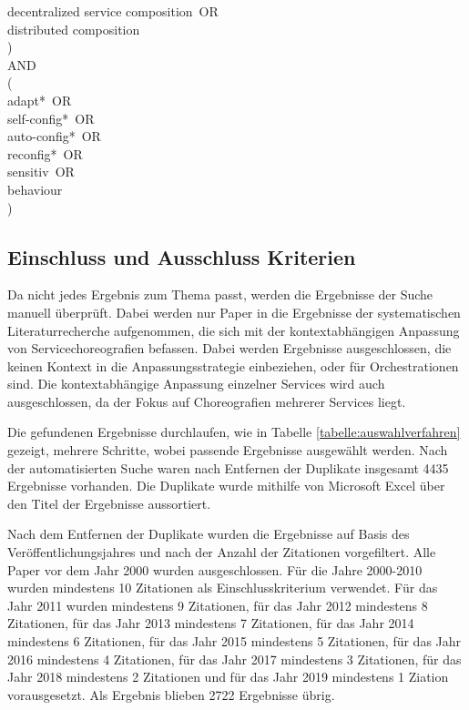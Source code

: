 \documentclass[conference,compsoc,ngerman]{IEEEtran}
\begin{document}
\glqq decentralized service composition\grqq~OR\\
\glqq distributed composition\grqq\\
) \\
AND\\
(\\
\glqq adapt*\grqq~OR\\
\glqq self-config*\grqq~OR\\
\glqq auto-config*\grqq~OR\\
\glqq reconfig*\grqq~OR\\
\glqq sensitiv\grqq~OR\\
\glqq behaviour\grqq\\
)\\

\subsection{Einschluss und Ausschluss Kriterien}
Da nicht jedes Ergebnis zum Thema passt, werden die Ergebnisse der Suche manuell überprüft. Dabei werden nur Paper in die Ergebnisse der systematischen Literaturrecherche aufgenommen, die sich mit der kontextabhängigen Anpassung von Servicechoreografien befassen. Dabei werden Ergebnisse ausgeschlossen, die keinen Kontext in die Anpassungsstrategie einbeziehen, oder für Orchestrationen sind. Die kontextabhängige Anpassung einzelner Services wird auch ausgeschlossen, da der Fokus auf Choreografien mehrerer Services liegt.

Die gefundenen Ergebnisse durchlaufen, wie in Tabelle \ref{tabelle:auswahlverfahren} gezeigt, mehrere Schritte, wobei passende Ergebnisse ausgewählt werden. Nach der automatisierten Suche waren nach Entfernen der Duplikate insgesamt 4435 Ergebnisse vorhanden. Die Duplikate wurde mithilfe von Microsoft Excel über den Titel der Ergebnisse aussortiert.

Nach dem Entfernen der Duplikate wurden die Ergebnisse auf Basis des Veröffentlichungsjahres und nach der Anzahl der Zitationen vorgefiltert.
Alle Paper vor dem Jahr 2000 wurden ausgeschlossen. Für die Jahre 2000-2010 wurden mindestens 10 Zitationen als Einschlusskriterium verwendet. Für das Jahr 2011 wurden mindestens 9 Zitationen, für das Jahr 2012 mindestens 8 Zitationen, für das Jahr 2013 mindestens 7 Zitationen, für das Jahr 2014 mindestens 6 Zitationen, für das Jahr 2015 mindestens 5 Zitationen, für das Jahr 2016 mindestens 4 Zitationen, für das Jahr 2017 mindestens 3 Zitationen, für das Jahr 2018 mindestens 2 Zitationen und für das Jahr 2019 mindestens 1 Ziation vorausgesetzt. Als Ergebnis blieben 2722 Ergebnisse übrig.
\end{document}
